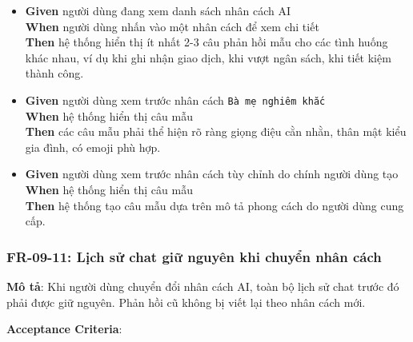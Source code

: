 \begin{itemize}
\item \textbf{Given} người dùng đang xem danh sách nhân cách AI  \\ \hspace*{1.5em}  \textbf{When} người dùng nhấn vào một nhân cách để xem chi tiết  \\ \hspace*{1.5em}  \textbf{Then} hệ thống hiển thị ít nhất 2-3 câu phản hồi mẫu cho các tình huống khác nhau, ví dụ khi ghi nhận giao dịch, khi vượt ngân sách, khi tiết kiệm thành công.
\item \textbf{Given} người dùng xem trước nhân cách \texttt{Bà mẹ nghiêm khắc}  \\ \hspace*{1.5em}  \textbf{When} hệ thống hiển thị câu mẫu  \\ \hspace*{1.5em}  \textbf{Then} các câu mẫu phải thể hiện rõ ràng giọng điệu cằn nhằn, thân mật kiểu gia đình, có emoji phù hợp.
\item \textbf{Given} người dùng xem trước nhân cách tùy chỉnh do chính người dùng tạo  \\ \hspace*{1.5em}  \textbf{When} hệ thống hiển thị câu mẫu  \\ \hspace*{1.5em}  \textbf{Then} hệ thống tạo câu mẫu dựa trên mô tả phong cách do người dùng cung cấp.
\end{itemize}
\subsubsection{FR-09-11: Lịch sử chat giữ nguyên khi chuyển nhân cách}

\textbf{Mô tả}: Khi người dùng chuyển đổi nhân cách AI, toàn bộ lịch sử chat trước đó phải được giữ nguyên. Phản hồi cũ không bị viết lại theo nhân cách mới.



\textbf{Acceptance Criteria}:

